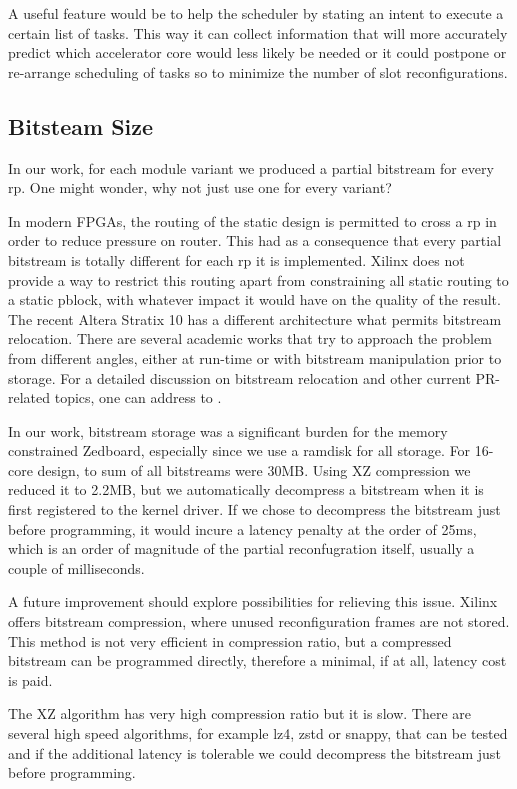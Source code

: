A useful feature would be to help the scheduler by stating an intent to execute a certain list of tasks.
This way it can collect information that will more accurately predict which accelerator core would less likely be needed
or it could postpone or re-arrange scheduling of tasks so to minimize the number of slot reconfigurations.

\subsection{Bitsteam Size}

In our work, for each module variant we produced a partial bitstream for every \gls{rp}.
One might wonder, why not just use one for every variant?

In modern FPGAs, the routing of the static design is permitted to cross a \gls{rp} in order to reduce pressure on router.
This had as a consequence that every partial bitstream is totally different for each \gls{rp} it is implemented.
Xilinx does not provide a way to restrict this routing apart from constraining all static routing to a static pblock,
with whatever impact it would have on the quality of the result. The recent Altera Stratix 10 has a different architecture
what permits bitstream relocation. There are several academic works that try to approach the problem from different angles,
either at run-time or with bitstream manipulation prior to storage.
For a detailed discussion on bitstream relocation and other current PR-related topics,
one can address to \cite{survey}.


In our work, bitstream storage was a significant burden for the memory constrained Zedboard,
especially since we use a ramdisk for all storage. For 16-core design, to sum of all bitstreams were 30MB.
Using XZ compression we reduced it to 2.2MB, but we automatically decompress a bitstream when it is
first registered to the kernel driver. If we chose to decompress the bitstream just before programming,
it would incure a latency penalty at the order of 25ms, 
which is an order of magnitude of the partial reconfugration itself, usually a couple of milliseconds.

A future improvement should explore possibilities for relieving this issue. 
Xilinx offers bitstream compression, where unused reconfiguration frames are not stored.
This method is not very efficient in compression ratio, but a compressed bitstream can be programmed
directly, therefore a minimal, if at all, latency cost is paid.

The XZ algorithm has very high compression ratio but it is slow. There are several high speed algorithms,
for example lz4, zstd or snappy, that can be tested and if the additional latency is tolerable we could
decompress the bitstream just before programming.

